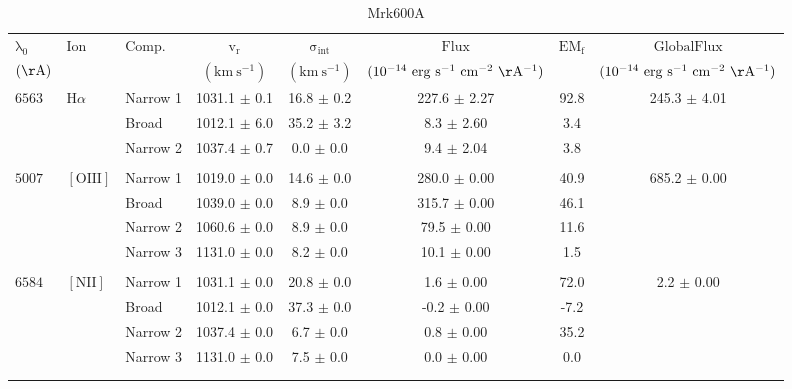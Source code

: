 \documentclass{article}
\begin{document}
\begin{longtable}{lllccccc}
\hline
$\mathrm{\lambda_0}$ & $\mathrm{Ion}$ & $\mathrm{Comp.}$ & $\mathrm{v_r}$ & $\mathrm{\sigma_{int}}$ & $\mathrm{Flux}$ & $\mathrm{EM_f}$ & $\mathrm{GlobalFlux}$ \\ 
$(\mathrm{\AA})$ &  &  & $(\mathrm{km \ s^{-1}})$ & $(\mathrm{km \ s^{-1}})$ & $(\mathrm{10^{-14} \ erg \ s^{-1} \ cm^{-2} \ \AA^{-1}})$ &  & $(\mathrm{10^{-14} \ erg \ s^{-1} \ cm^{-2} \ \AA^{-1}})$ \\ 
\hline
$6563$ & $\mathrm{H}\alpha$ & Narrow 1 & 1031.1 $\pm$ 0.1 & 16.8 $\pm$ 0.2 & 227.6 $\pm$ 2.27 & 92.8 & 245.3 $\pm$ 4.01 \\ 
 &  & Broad & 1012.1 $\pm$ 6.0 & 35.2 $\pm$ 3.2 & 8.3 $\pm$ 2.60 & 3.4 &  \\ 
 &  & Narrow 2 & 1037.4 $\pm$ 0.7 & 0.0 $\pm$ 0.0 & 9.4 $\pm$ 2.04 & 3.8 &  \\ 
 &  &  &  &  &  &  &  \\ 
$5007$ & $\mathrm{[OIII]}$ & Narrow 1 & 1019.0 $\pm$ 0.0 & 14.6 $\pm$ 0.0 & 280.0 $\pm$ 0.00 & 40.9 & 685.2 $\pm$ 0.00 \\ 
 &  & Broad & 1039.0 $\pm$ 0.0 & 8.9 $\pm$ 0.0 & 315.7 $\pm$ 0.00 & 46.1 &  \\ 
 &  & Narrow 2 & 1060.6 $\pm$ 0.0 & 8.9 $\pm$ 0.0 & 79.5 $\pm$ 0.00 & 11.6 &  \\ 
 &  & Narrow 3 & 1131.0 $\pm$ 0.0 & 8.2 $\pm$ 0.0 & 10.1 $\pm$ 0.00 & 1.5 &  \\ 
 &  &  &  &  &  &  &  \\ 
$6584$ & $\mathrm{[NII]}$ & Narrow 1 & 1031.1 $\pm$ 0.0 & 20.8 $\pm$ 0.0 & 1.6 $\pm$ 0.00 & 72.0 & 2.2 $\pm$ 0.00 \\ 
 &  & Broad & 1012.1 $\pm$ 0.0 & 37.3 $\pm$ 0.0 & -0.2 $\pm$ 0.00 & -7.2 &  \\ 
 &  & Narrow 2 & 1037.4 $\pm$ 0.0 & 6.7 $\pm$ 0.0 & 0.8 $\pm$ 0.00 & 35.2 &  \\ 
 &  & Narrow 3 & 1131.0 $\pm$ 0.0 & 7.5 $\pm$ 0.0 & 0.0 $\pm$ 0.00 & 0.0 &  \\ 
 &  &  &  &  &  &  &  \\ 
\hline
\caption{Mrk600A}
\end{longtable}
\end{document}
